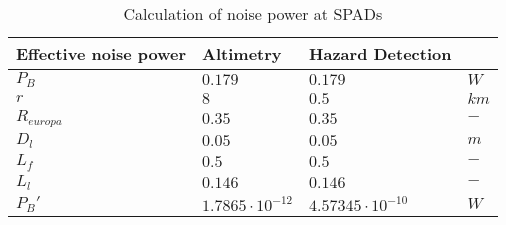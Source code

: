 \begin{table}[H]
\centering
\caption{Calculation of noise power at SPADs}
\label{tab:effective_noise_power}
\begin{tabular}{|l|lll|} \hline
\textbf{Effective noise power} & \textbf{Altimetry}    & \textbf{Hazard Detection} &      \\ \hline
$P_B$            & $0.179$               & $0.179$                   & $W$  \\
$r$              & $8$                   & $0.5$                     & $km$ \\
$R_{europa}$     & $0.35$                & $0.35$                    & $-$     \\
$D_l$            & $0.05$                & $0.05$                    & $m$     \\
$L_f$            & $0.5$                 & $0.5$                     & $-$     \\
$L_l$            & $0.146$               & $0.146$                   & $-$     \\
$P_B'$           & $1.7865\cdot10^{-12}$ & $4.57345\cdot10^{-10}$    & $W$  \\ \hline
\end{tabular}
\end{table}